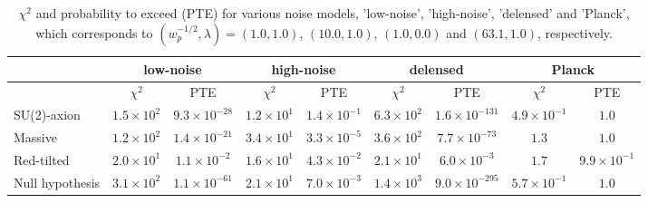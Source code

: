 \documentclass[tightenlines,floats,aps,nofootinbib,prd,onecolumn,preprintnumbers]{revtex4}
\begin{document}
\begin{table}[!ht]
\centering
\begin{tabular}{|l|cc|cc|cc|cc|}
\hline
            & \multicolumn{2}{c|}{low-noise} 
            & \multicolumn{2}{c|}{high-noise} 
            & \multicolumn{2}{c|}{delensed}
            & \multicolumn{2}{c|}{Planck} \\\hline
            & $\chi^2$ & PTE
            & $\chi^2$ & PTE
            & $\chi^2$ & PTE
            & $\chi^2$ & PTE  \\\hline
SU(2)-axion & $1.5\times 10^{2}$  & $9.3\times 10^{-28}$
            & $1.2\times 10^{1}$  & $1.4\times 10^{-1}$
            & $6.3\times 10^{2}$  & $1.6\times 10^{-131}$
            & $4.9\times 10^{-1}$ & $1.0$ \\
Massive     & $1.2\times 10^{2}$ & $1.4\times 10^{-21}$
            & $3.4\times 10^{1}$ & $3.3\times 10^{-5}$
            & $3.6\times 10^{2}$ & $7.7\times 10^{-73}$
            & $1.3$              & $1.0$ \\
Red-tilted  & $2.0\times 10^{1}$ & $1.1\times 10^{-2}$
            & $1.6\times 10^{1}$ & $4.3\times 10^{-2}$
            & $2.1\times 10^{1}$ & $6.0\times 10^{-3}$
            & $1.7$              & $9.9\times 10^{-1}$\\
Null hypothesis
                 & $3.1\times 10^{2}$  & $1.1\times 10^{-61}$
                 & $2.1\times 10^{1}$  & $7.0\times 10^{-3}$
                 & $1.4\times 10^{3}$  & $9.0\times 10^{-295}$
                 & $5.7\times 10^{-1}$ & $1.0$ \\ \hline
\end{tabular} 
 \caption{$\chi^2$ and probability to exceed (PTE) for various noise models, 'low-noise', 'high-noise',
 'delensed' and 'Planck', which corresponds to $(w_p^{-1/2},\lambda)=(1.0,1.0)$,
 $(10.0,1.0)$, $(1.0,0.0)$ and $(63.1,1.0)$, respectively.}
 \label{tab:chi2}
\end{table}
\end{document}
